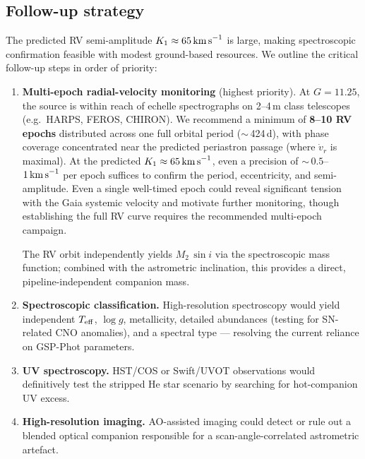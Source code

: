 \documentclass[usenatbib,fleqn]{mnras}
\newcommand{\kms}{{\rm km\,s}^{-1}}
\begin{document}
\subsection{Follow-up strategy}
\label{sec:followup}

The predicted RV semi-amplitude $K_1 \approx 65\,\kms$ is
large, making spectroscopic confirmation feasible with modest
ground-based resources.  We outline the critical follow-up
steps in order of priority:

\begin{enumerate}
\item \textbf{Multi-epoch radial-velocity monitoring}
  (highest priority).  At $G = 11.25$, the source is within reach
  of echelle spectrographs on 2--4\,m class telescopes
  (e.g.\ HARPS, FEROS, CHIRON).  We recommend a minimum of
  \textbf{8--10 RV epochs} distributed across one full orbital
  period ($\sim$\,424\,d), with phase coverage concentrated near
  the predicted periastron passage (where $\dot{v}_r$ is maximal).
  At the predicted $K_1 \approx 65\,\kms$, even a precision of
  $\sim$\,$0.5$--$1\,\kms$ per epoch suffices to confirm the
  period, eccentricity, and semi-amplitude.  Even a single
  well-timed epoch could reveal significant tension with the
  Gaia systemic velocity and motivate further monitoring,
  though establishing the full RV curve requires the recommended
  multi-epoch campaign.

  The RV orbit independently yields $M_2\,\sin i$ via the
  spectroscopic mass function; combined with the astrometric
  inclination, this provides a direct, pipeline-independent
  companion mass.

\item \textbf{Spectroscopic classification.}  High-resolution
  spectroscopy would yield independent $T_{\rm eff}$, $\log g$,
  metallicity, detailed abundances (testing for SN-related CNO
  anomalies), and a spectral type --- resolving the current
  reliance on GSP-Phot parameters.

\item \textbf{UV spectroscopy.}  HST/COS or Swift/UVOT
  observations would definitively test the stripped He star
  scenario by searching for hot-companion UV excess.

\item \textbf{High-resolution imaging.}  AO-assisted imaging
  could detect or rule out a blended optical companion responsible
  for a scan-angle-correlated astrometric artefact.
\end{enumerate}
\end{document}
